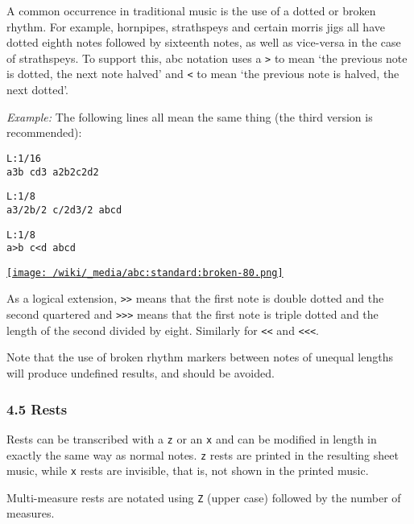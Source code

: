 A common occurrence in traditional music is the use of a dotted or
broken rhythm. For example, hornpipes, strathspeys and certain morris
jigs all have dotted eighth notes followed by sixteenth notes, as well
as vice-versa in the case of strathspeys. To support this, abc notation
uses a \texttt{\textgreater{}} to mean `the previous note is dotted, the
next note halved' and \texttt{\textless{}} to mean `the previous note is
halved, the next dotted'.

\emph{Example:} The following lines all mean the same thing (the third
version is recommended):

\begin{verbatim}
L:1/16
a3b cd3 a2b2c2d2
\end{verbatim}

\begin{verbatim}
L:1/8
a3/2b/2 c/2d3/2 abcd
\end{verbatim}

\begin{verbatim}
L:1/8
a>b c<d abcd
\end{verbatim}

\href{/wiki/_detail/abc:standard:broken-80.png?id=abc\%3Astandard\%3Av2.1}{\texttt{[image: /wiki/\_media/abc:standard:broken-80.png]}}

As a logical extension, \texttt{\textgreater{}\textgreater{}} means that
the first note is double dotted and the second quartered and
\texttt{\textgreater{}\textgreater{}\textgreater{}} means that the first
note is triple dotted and the length of the second divided by eight.
Similarly for \texttt{\textless{}\textless{}} and
\texttt{\textless{}\textless{}\textless{}}.

Note that the use of broken rhythm markers between notes of unequal
lengths will produce undefined results, and should be avoided.

\hypertarget{rests}{\subsubsection{4.5 Rests}\label{rests}}

Rests can be transcribed with a \texttt{z} or an \texttt{x} and can be
modified in length in exactly the same way as normal notes. \texttt{z}
rests are printed in the resulting sheet music, while \texttt{x} rests
are invisible, that is, not shown in the printed music.

Multi-measure rests are notated using \texttt{Z} (upper case) followed
by the number of measures.

